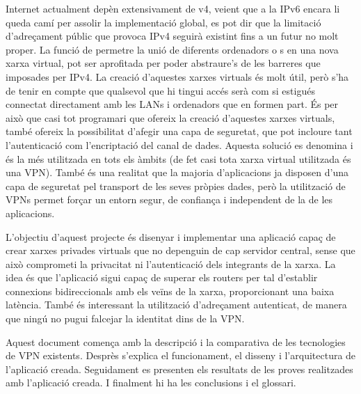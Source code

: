 Internet actualment depèn extensivament de v4, veient que a la IPv6 encara li queda camí per assolir la implementació global, es pot dir que la limitació d'adreçament públic que provoca IPv4 seguirà existint fins a un futur no molt proper. La funció de permetre la unió de diferents ordenadors o s en una nova xarxa virtual, pot ser aprofitada per poder abstraure's de les barreres que imposades per IPv4. La creació d'aquestes xarxes virtuals és molt útil, però s'ha de tenir en compte que qualsevol que hi tingui accés serà com si estigués connectat directament amb les LANs i ordenadors que en formen part. És per això que casi tot programari que ofereix la creació d'aquestes xarxes virtuals, també ofereix la possibilitat d'afegir una capa de seguretat, que pot incloure tant l'autenticació com l'encriptació del canal de dades. Aquesta solució es denomina  i és la més utilitzada en tots els àmbits (de fet casi tota xarxa virtual utilitzada és una VPN).
També és una realitat que la majoria d'aplicacions ja disposen d'una capa de seguretat pel transport de les seves pròpies dades, però la utilització de VPNs permet forçar un entorn segur, de confiança i independent de la de les aplicacions. 

L'objectiu d'aquest projecte és disenyar i implementar una aplicació capaç de crear xarxes privades virtuals que no depenguin de cap servidor central, sense que això comprometi la privacitat ni l'autenticació dels integrants de la xarxa. La idea és que l'aplicació sigui capaç de superar els routers  per tal d'establir connexions bidireccionals amb els veïns de la xarxa, proporcionant una baixa latència. També és interessant la utilització d'adreçament autenticat, de manera que ningú no pugui falcejar la identitat dins de la VPN.

Aquest document comença amb la descripció i la comparativa de les tecnologies de VPN existents.
Desprès s'explica el funcionament, el disseny i l'arquitectura de l'aplicació creada.
Seguidament es presenten els resultats de les proves realitzades amb l'aplicació creada. 
I finalment hi ha les conclusions i el glossari.

